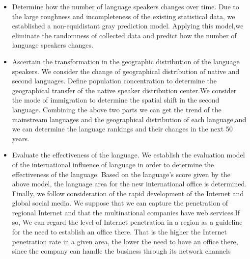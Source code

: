 \begin{itemize}
	\item 
	Determine how the number of language speakers changes over time. Due to the large roughness and incompleteness of the existing statistical data, we established a non-equidistant gray prediction model. Applying this model,we eliminate the randomness of collected data and predict how the number of language speakers changes.
	\item Ascertain the transformation in the geographic distribution of the language speakers. We consider the change of geographical distribution of native and second languages. Define population concentration to determine the geographical transfer of the native speaker distribution center.We consider the mode of immigration to determine the spatial shift in the second language. Combining the above two parts we can get the trend of the mainstream languages and the geographical distribution of each language,and we can determine the language rankings and their changes in the next 50 years. 
	\item Evaluate the effectiveness of the language. We establish the evaluation model of the international influence of language in order to determine the effectiveness of the language. Based on the language's score given by the above model, the language area for the new international office is determined. Finally, we follow consideration of the rapid development of the Internet and global social media. We suppose that we can capture the penetration of regional Internet and that the multinational companies have web services.If so, We can regard the level of Internet penetration in a region as a guideline for the need to establish an office there. That is the higher the Internet penetration rate in a given area, the lower the need to have an office there, since the company can handle the business through its network channels
	
\end{itemize}

